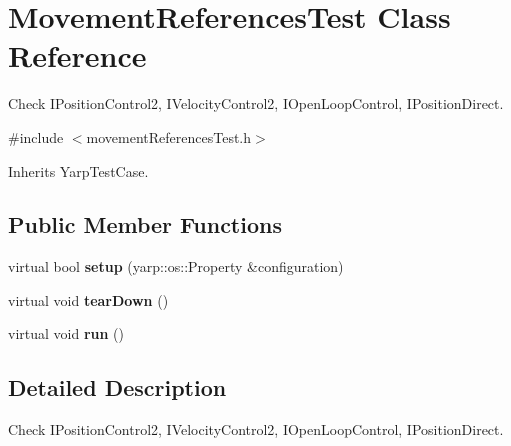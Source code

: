\section{Movement\+References\+Test Class Reference}
\label{classMovementReferencesTest}


Check I\+Position\+Control2, I\+Velocity\+Control2, I\+Open\+Loop\+Control, I\+Position\+Direct.  




{\ttfamily \#include $<$movement\+References\+Test.\+h$>$}



Inherits Yarp\+Test\+Case.

\subsection*{Public Member Functions}
\begin{DoxyCompactItemize}
\item 
\label{classMovementReferencesTest_ad9cc73f5b5865dec9d185bf4063e53a8} 
virtual bool {\bfseries setup} (yarp\+::os\+::\+Property \&configuration)
\item 
\label{classMovementReferencesTest_a593c8be2be3fe9bf79c7d0d7c5d817b9} 
virtual void {\bfseries tear\+Down} ()
\item 
\label{classMovementReferencesTest_afd727ad62714859a969e5b3c47959eca} 
virtual void {\bfseries run} ()
\end{DoxyCompactItemize}


\subsection{Detailed Description}
Check I\+Position\+Control2, I\+Velocity\+Control2, I\+Open\+Loop\+Control, I\+Position\+Direct. 


